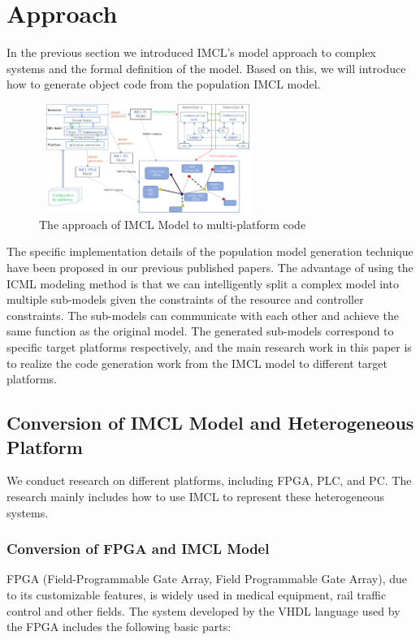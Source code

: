 \section{Approach}
In the previous section we introduced IMCL's model approach to complex systems and the formal definition of the model. Based on this, we will introduce how to generate object code from the population IMCL model.

\begin{figure}[!htb]
  \centering
        \includegraphics[height=1.4in, width=2.8in]{approach}
  \caption{The approach of IMCL Model to multi-platform code}\label{approach}
\end{figure}

The specific implementation details of the population model generation technique have been proposed in our previous published papers. The advantage of using the ICML modeling method is that we can intelligently split a complex model into multiple sub-models given the constraints of the resource and controller constraints. The sub-models can communicate with each other and achieve the same function as the original model. The generated sub-models correspond to specific target platforms respectively, and the main research work in this paper is to realize the code generation work from the IMCL model to different target platforms.


\subsection{Conversion of IMCL Model and Heterogeneous Platform}
We conduct research on different platforms, including FPGA, PLC, and PC. The research mainly includes how to use IMCL to represent these heterogeneous systems.

\subsubsection{\textbf{Conversion of FPGA and IMCL Model}}
FPGA (Field-Programmable Gate Array, Field Programmable Gate Array), due to its customizable features, is widely used in medical equipment, rail traffic control and other fields. The system developed by the VHDL language used by the FPGA includes the following basic parts:

